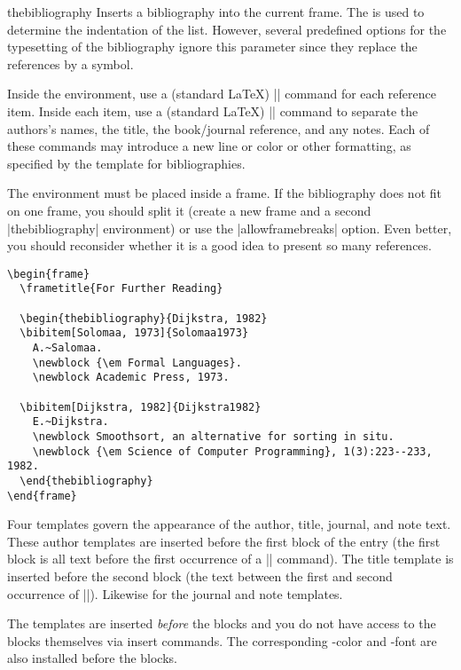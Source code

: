 \begin{environment}{{thebibliography}}
  Inserts a bibliography into the current frame. The  is used to determine the indentation of the list. However,
  several predefined options for the typesetting of the bibliography
  ignore this parameter since they replace the references by a symbol.

  Inside the environment, use a (standard \LaTeX) |\bibitem| command
  for each reference item. Inside each item, use a (standard \LaTeX)
  |\newblock| command to separate the authors's names, the title, the
  book/journal reference, and any notes. Each of these commands may
  introduce a new line or color or other formatting, as specified by
  the template for bibliographies.

  The environment must be placed inside a frame. If the bibliography
  does not fit on one frame, you should
  split it (create a new frame and a second |thebibliography|
  environment) or use the |allowframebreaks| option. Even better, you
  should reconsider whether it is a good idea to present so many
  references.
  \example
\begin{verbatim}
\begin{frame}
  \frametitle{For Further Reading}

  \begin{thebibliography}{Dijkstra, 1982}
  \bibitem[Solomaa, 1973]{Solomaa1973}
    A.~Salomaa.
    \newblock {\em Formal Languages}.
    \newblock Academic Press, 1973.

  \bibitem[Dijkstra, 1982]{Dijkstra1982}
    E.~Dijkstra.
    \newblock Smoothsort, an alternative for sorting in situ.
    \newblock {\em Science of Computer Programming}, 1(3):223--233, 1982.
  \end{thebibliography}
\end{frame}
\end{verbatim}

  Four templates govern the appearance of the author, title, journal,
  and note text. These author templates are inserted before the first block
  of the entry (the first block is all text before the first occurrence of a
  |\newblock| command). The title template is inserted before
  the second block (the text between the first and second occurrence
  of |\newblock|). Likewise for the journal and note templates.

  The templates are inserted \emph{before} the blocks and you do not
  have access to the blocks themselves via insert commands. The
  corresponding \beamer-color and -font are also installed before the
  blocks.


\end{environment}
